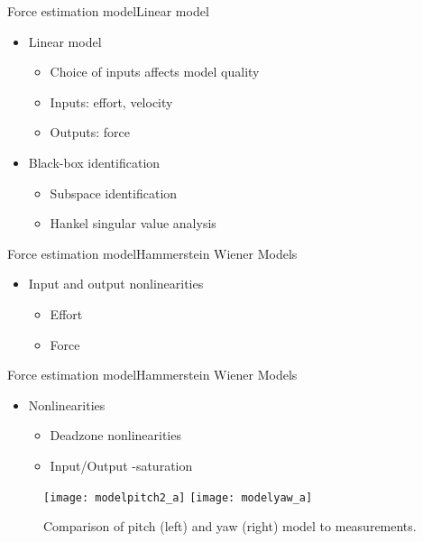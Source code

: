 \begin{frame}{Force estimation model}{Linear model}
\begin{itemize}
\item Linear model
  \begin{itemize}
  \item Choice of inputs affects model quality
  \item Inputs: effort, velocity 
  \item Outputs: force
  \end{itemize}
\item Black-box identification
	\begin{itemize}
	\item Subspace identification
	\item Hankel singular value analysis
	\end{itemize}
\end{itemize}

\end{frame}



\begin{frame}{Force estimation model}{Hammerstein Wiener Models}
\begin{itemize}
\item Input and output nonlinearities
  \begin{itemize}
  \item Effort 
  \item Force
  \end{itemize}
\end{itemize}
\end{frame}







\begin{frame}{Force estimation model}{Hammerstein Wiener Models}
\begin{itemize}
  \item Nonlinearities
  \begin{itemize}
    \item Deadzone nonlinearities
    \item Input/Output -saturation 
  \end{itemize}
\end{itemize}


 \begin{figure}[h]
 \centering
 \texttt{[image: modelpitch2\_a]}
 \texttt{[image: modelyaw\_a]}
 \caption{Comparison of pitch (left) and yaw (right) model to measurements.}
 \label{fig:final_res_yaw}
 \end{figure}
\end{frame}
